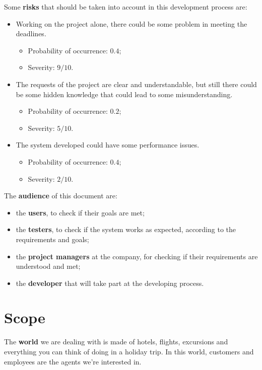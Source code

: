 \documentclass[a4paper,12pt]{book}
\begin{document}
Some \textbf{risks} that should be taken into account in this development process are:
\begin{itemize}
  \item Working on the project alone, there could be some problem in meeting the deadlines.
  \begin{itemize}[noitemsep]
    \item Probability of occurrence: $ 0.4 $;
    \item Severity: $ 9/10 $.
  \end{itemize}
  \item The requests of the project are clear and understandable, but still there could be some hidden knowledge that could lead to some misunderstanding.
  \begin{itemize}[noitemsep]
    \item Probability of occurrence: $ 0.2 $;
    \item Severity: $ 5/10 $.
  \end{itemize}
  \item The system developed could have some performance issues.
  \begin{itemize}[noitemsep]
    \item Probability of occurrence: $ 0.4 $;
    \item Severity: $ 2/10 $.
  \end{itemize}
\end{itemize}

The \textbf{audience} of this document are:
\begin{itemize}
  \item the \textbf{users}, to check if their goals are met;
  \item the \textbf{testers}, to check if the system works as expected, according to the requirements and goals;
  \item the \textbf{project managers} at the company, for checking if their requirements are understood and met;
  \item the \textbf{developer} that will take part at the developing process.
\end{itemize}

\section{Scope}
The \textbf{world} we are dealing with is made of hotels, flights, excursions and everything you can think of doing in a holiday trip. In this world, customers and employees are the agents we're interested in.\newline
\end{document}
